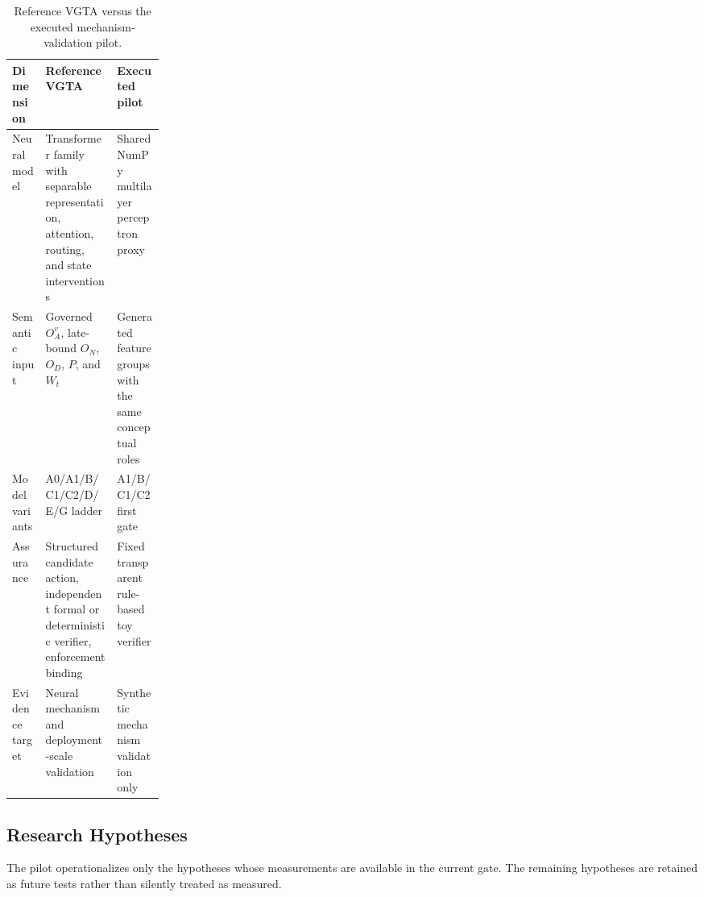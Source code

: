 \begin{table}[t]
\centering
\scriptsize
\caption{Reference VGTA versus the executed mechanism-validation pilot.}
\label{tab:reference-pilot}
\renewcommand{\arraystretch}{1.12}
\begin{tabularx}{\linewidth}{@{}p{0.22\linewidth}XX@{}}
\toprule
Dimension & Reference VGTA & Executed pilot \\
\midrule
Neural model & Transformer family with separable representation, attention, routing, and state interventions & Shared NumPy multilayer perceptron proxy \\
Semantic input & Governed $O_A^v$, late-bound $O_N$, $O_D$, $P$, and $W_t$ & Generated feature groups with the same conceptual roles \\
Model variants & A0/A1/B/C1/C2/D/E/G ladder & A1/B/C1/C2 first gate \\
Assurance & Structured candidate action, independent formal or deterministic verifier, enforcement binding & Fixed transparent rule-based toy verifier \\
Evidence target & Neural mechanism and deployment-scale validation & Synthetic mechanism validation only \\
\bottomrule
\end{tabularx}
\end{table}






\subsection{Research Hypotheses}

The pilot operationalizes only the hypotheses whose measurements are available in the current gate. The remaining hypotheses are retained as future tests rather than silently treated as measured.

